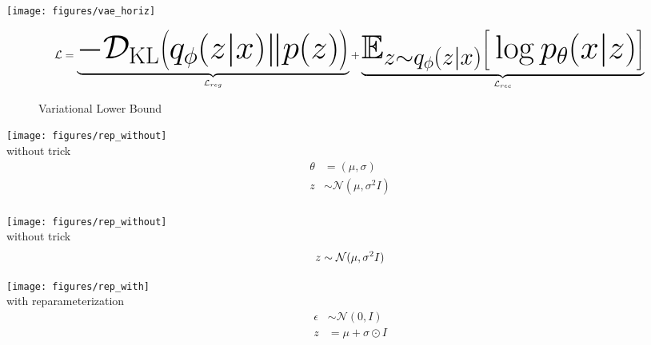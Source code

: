 \documentclass[11pt, a4paper, landscape]{article}
\begin{document}
\NewOverlay{}
\begin{center}
  \texttt{[image: figures/vae\_horiz]}\\
\end{center}
\vfill
\begin{figure}
	\begin{equation}
		\Large \mathcal{L} = \underbrace{-\mathcal{D}_{\mathrm{KL}}\big(q_\phi(z|x) \| p(z)\big)}_{\mathcal{L}_{reg}} + \underbrace{\mathbb{E}_{z \sim q_\phi(z|x)}\big[ \log p_\theta(x|z)\big]}_{\mathcal{L}_{rec}}\\
	\end{equation}
	\caption{Variational Lower Bound}
\end{figure}
\vfill


\NewPage{}
\begin{minipage}[t]{.5\linewidth}
	\begin{center}
		\texttt{[image: figures/rep\_without]}\\
		without trick
		\begin{align*}
			\theta &= (\mu, \sigma)\\
			z &\sim \mathcal{N}(\mu, \sigma^2 I)\\
		\end{align*}
	\end{center}
\end{minipage}

\NewOverlay{}
\begin{minipage}[t]{.5\linewidth}
	\begin{center}
		\texttt{[image: figures/rep\_without]}\\
		without trick
		\begin{align*}
			\medskip
			z &\sim \mathcal{N}(\mu, \sigma^2 I)\\
		\end{align*}
	\end{center}
\end{minipage}
\begin{minipage}[t]{0.5\linewidth}
	\begin{center}
		\texttt{[image: figures/rep\_with]}\\
		with reparameterization
		\begin{align*}
			\epsilon &\sim \mathcal{N}(0,I)\\
			z &= \mu + \sigma \odot I\\
		\end{align*}
	\end{center}
\end{minipage}
\end{document}
